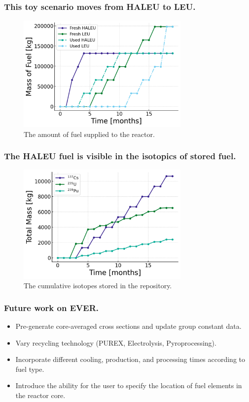 \documentclass[9pt]{beamer}
\begin{document}
\begin{frame}
  \frametitle{This toy scenario moves from HALEU to LEU.}
  \begin{figure}
    \centering
    \includegraphics[width=0.75\textwidth]{images/mass_fuel.png}
    \caption{The amount of fuel supplied to the reactor.}
  \end{figure}
\end{frame}

\begin{frame}
  \frametitle{The HALEU fuel is visible in the isotopics of stored fuel.}
  \begin{figure}
    \centering
    \includegraphics[width=0.75\textwidth]{images/mass_isotopes.png}
    \caption{The cumulative isotopes stored in the repository.}
  \end{figure}
\end{frame}

\begin{frame}
  \frametitle{Future work on EVER.}
  \begin{itemize}
    \item Pre-generate core-averaged cross sections and update group constant data.
    \item Vary recycling technology (PUREX, Electrolysis, Pyroprocessing).
    \item Incorporate different cooling, production, and processing times according to fuel type.
    \item Introduce the ability for the user to specify the location of fuel elements in the reactor core.
  \end{itemize}
\end{frame}
\end{document}
